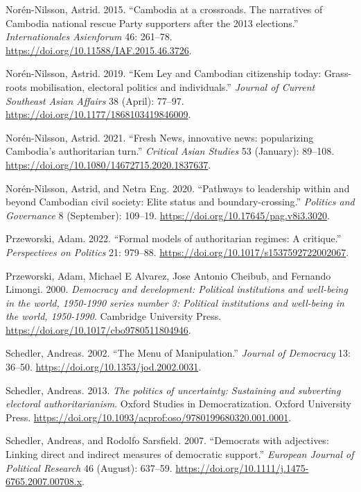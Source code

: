\documentclass[
  12pt,
  letterpaper]{article}
\newlength{\cslhangindent}
\newenvironment{CSLReferences}[2] %
 {\begin{list}{}{%
  \setlength{\itemindent}{0pt}
  \setlength{\leftmargin}{0pt}
  \setlength{\parsep}{0pt}
  \ifodd #1
   \setlength{\leftmargin}{\cslhangindent}
   \setlength{\itemindent}{-1\cslhangindent}
  \fi
  \setlength{\itemsep}{#2\baselineskip}}}
 {\end{list}}
\begin{document}
\begin{CSLReferences}{1}{1}
Norén-Nilsson, Astrid. 2015. {``{Cambodia at a crossroads. The
narratives of Cambodia national rescue Party supporters after the 2013
elections}.''} \emph{Internationales Asienforum} 46: 261--78.
\url{https://doi.org/10.11588/IAF.2015.46.3726}.

Norén-Nilsson, Astrid. 2019. {``{Kem Ley and Cambodian citizenship
today: Grass-roots mobilisation, electoral politics and individuals}.''}
\emph{Journal of Current Southeast Asian Affairs} 38 (April): 77--97.
\url{https://doi.org/10.1177/1868103419846009}.

Norén-Nilsson, Astrid. 2021. {``{Fresh News, innovative news:
popularizing Cambodia's authoritarian turn}.''} \emph{Critical Asian
Studies} 53 (January): 89--108.
\url{https://doi.org/10.1080/14672715.2020.1837637}.

Norén-Nilsson, Astrid, and Netra Eng. 2020. {``{Pathways to leadership
within and beyond Cambodian civil society: Elite status and
boundary-crossing}.''} \emph{Politics and Governance} 8 (September):
109--19. \url{https://doi.org/10.17645/pag.v8i3.3020}.

Przeworski, Adam. 2022. {``{Formal models of authoritarian regimes: A
critique}.''} \emph{Perspectives on Politics} 21: 979--88.
\url{https://doi.org/10.1017/s1537592722002067}.

Przeworski, Adam, Michael E Alvarez, Jose Antonio Cheibub, and Fernando
Limongi. 2000. \emph{{Democracy and development: Political institutions
and well-being in the world, 1950-1990 series number 3: Political
institutions and well-being in the world, 1950-{1990}}}. Cambridge
University Press. \url{https://doi.org/10.1017/cbo9780511804946}.

Schedler, Andreas. 2002. {``{The Menu of Manipulation}.''} \emph{Journal
of Democracy} 13: 36--50. \url{https://doi.org/10.1353/jod.2002.0031}.

Schedler, Andreas. 2013. \emph{{The politics of uncertainty: Sustaining
and subverting electoral authoritarianism}}. Oxford Studies in
Democratization. Oxford University Press.
\url{https://doi.org/10.1093/acprof:oso/9780199680320.001.0001}.

Schedler, Andreas, and Rodolfo Sarsfield. 2007. {``{Democrats with
adjectives: Linking direct and indirect measures of democratic
support}.''} \emph{European Journal of Political Research} 46 (August):
637--59. \url{https://doi.org/10.1111/j.1475-6765.2007.00708.x}.


\end{CSLReferences}
\end{document}
